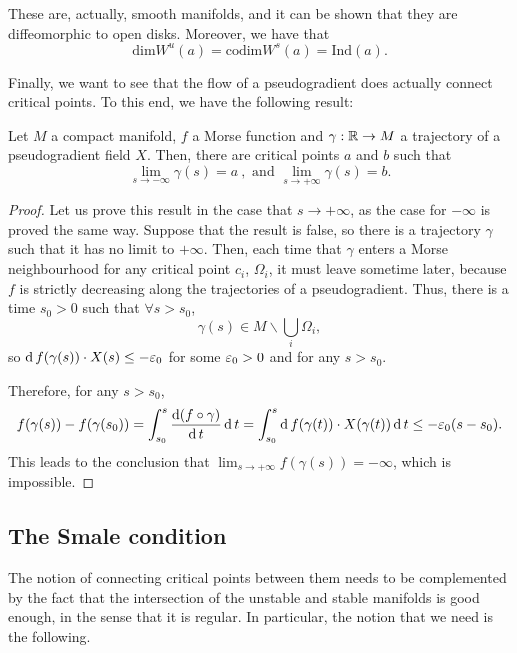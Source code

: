 These are, actually, smooth manifolds, and it can be shown that they are diffeomorphic to open disks. Moreover, we have that
$$\text{dim} W^u(a) = \text{codim} W^s(a) = \text{Ind}(a) .$$

Finally, we want to see that the flow of a pseudogradient does actually connect critical points. To this end, we have the following result:

\begin{prop} \label{prop:connect_critical_points}
Let $M$ a compact manifold, $f$ a Morse function and $\gamma : \mathbb{R} \rightarrow M$ a trajectory of a pseudogradient field $X$. Then, there are critical points $a$ and $b$ such that
\begin{displaymath}
\lim_{s \rightarrow - \infty} \gamma(s) = a \ , \text{ and } \lim_{s \rightarrow + \infty} \gamma(s) = b .
\end{displaymath}
\end{prop}

\begin{proof}
Let us prove this result in the case that $s \rightarrow + \infty$, as the case for $- \infty$ is proved the same way. Suppose that the result is false, so there is a trajectory $\gamma$ such that it has no limit to $+ \infty$. Then, each time that $\gamma$ enters a Morse neighbourhood for any critical point $c_i$, $\Omega_i$, it must leave sometime later, because $f$ is strictly decreasing along the trajectories of a pseudogradient. Thus, there is a time $s_0 > 0$ such that $\forall s > s_0$,
$$\gamma(s) \in M \backslash \bigcup_i \Omega_i ,$$
so $\operatorname d f(\gamma(s)) \cdot X(s) \leq - \varepsilon_0$ for some $\varepsilon_0 > 0$ and for any $s > s_0$.

Therefore, for any $s > s_0$,
\begin{displaymath}
f(\gamma(s))-f(\gamma(s_0)) = \int_{s_0}^s \frac{\operatorname d (f \circ \gamma)}{\operatorname d t} \operatorname d t = \int_{s_0}^s \operatorname d f(\gamma(t)) \cdot X(\gamma(t)) \operatorname d t \leq - \varepsilon_0 (s-s_0) .
\end{displaymath}
This leads to the conclusion that $\displaystyle\lim_{s \rightarrow +\infty} f(\gamma(s)) = - \infty$, which is impossible.
\end{proof}

\subsection{The Smale condition}

The notion of connecting critical points between them needs to be complemented by the fact that the intersection of the unstable and stable manifolds is good enough, in the sense that it is regular. In particular, the notion that we need is the following.


